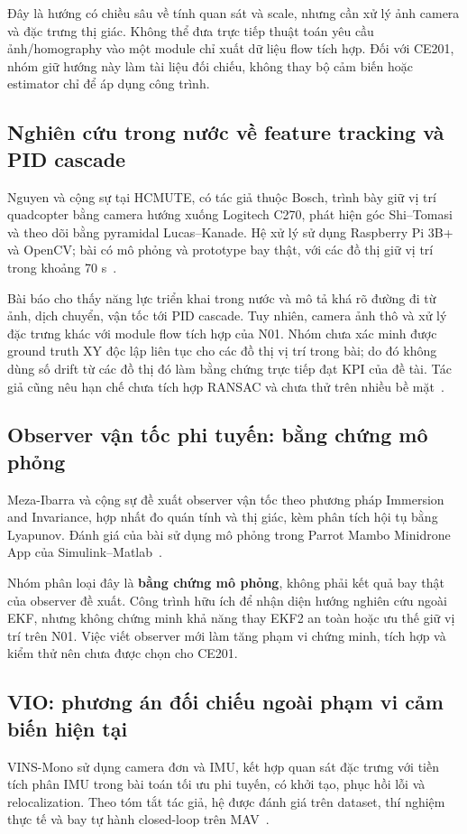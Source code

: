 \documentclass[a4paper,12pt]{article}
\begin{document}
Đây là hướng có chiều sâu về tính quan sát và scale, nhưng cần xử lý ảnh camera và đặc trưng thị giác. Không thể đưa trực tiếp thuật toán yêu cầu ảnh/homography vào một module chỉ xuất dữ liệu flow tích hợp. Đối với CE201, nhóm giữ hướng này làm tài liệu đối chiếu, không thay bộ cảm biến hoặc estimator chỉ để áp dụng công trình.

\subsection{Nghiên cứu trong nước về feature tracking và PID cascade}
Nguyen và cộng sự tại HCMUTE, có tác giả thuộc Bosch, trình bày giữ vị trí quadcopter bằng camera hướng xuống Logitech C270, phát hiện góc Shi--Tomasi và theo dõi bằng pyramidal Lucas--Kanade. Hệ xử lý sử dụng Raspberry Pi 3B+ và OpenCV; bài có mô phỏng và prototype bay thật, với các đồ thị giữ vị trí trong khoảng 70 s~\cite{source7}.

Bài báo cho thấy năng lực triển khai trong nước và mô tả khá rõ đường đi từ ảnh, dịch chuyển, vận tốc tới PID cascade. Tuy nhiên, camera ảnh thô và xử lý đặc trưng khác với module flow tích hợp của N01. Nhóm chưa xác minh được ground truth XY độc lập liên tục cho các đồ thị vị trí trong bài; do đó không dùng số drift từ các đồ thị đó làm bằng chứng trực tiếp đạt KPI của đề tài. Tác giả cũng nêu hạn chế chưa tích hợp RANSAC và chưa thử trên nhiều bề mặt~\cite{source7}.

\subsection{Observer vận tốc phi tuyến: bằng chứng mô phỏng}
Meza-Ibarra và cộng sự đề xuất observer vận tốc theo phương pháp Immersion and Invariance, hợp nhất đo quán tính và thị giác, kèm phân tích hội tụ bằng Lyapunov. Đánh giá của bài sử dụng mô phỏng trong Parrot Mambo Minidrone App của Simulink--Matlab~\cite{source8}.

Nhóm phân loại đây là \textbf{bằng chứng mô phỏng}, không phải kết quả bay thật của observer đề xuất. Công trình hữu ích để nhận diện hướng nghiên cứu ngoài EKF, nhưng không chứng minh khả năng thay EKF2 an toàn hoặc ưu thế giữ vị trí trên N01. Việc viết observer mới làm tăng phạm vi chứng minh, tích hợp và kiểm thử nên chưa được chọn cho CE201.

\subsection{VIO: phương án đối chiếu ngoài phạm vi cảm biến hiện tại}
VINS-Mono sử dụng camera đơn và IMU, kết hợp quan sát đặc trưng với tiền tích phân IMU trong bài toán tối ưu phi tuyến, có khởi tạo, phục hồi lỗi và relocalization. Theo tóm tắt tác giả, hệ được đánh giá trên dataset, thí nghiệm thực tế và bay tự hành closed-loop trên MAV~\cite{source9}.
\end{document}
